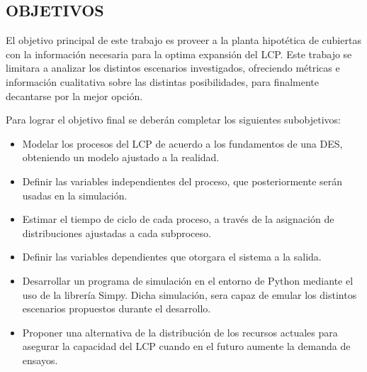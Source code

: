 \subsection{OBJETIVOS}\label{sec_obj}
El objetivo principal de este trabajo
es proveer a la planta hipotética de cubiertas
con la información necesaria para la optima expansión del LCP.
Este trabajo se limitara a analizar los distintos escenarios investigados,
ofreciendo métricas e información cualitativa
sobre las distintas posibilidades,
para finalmente decantarse por la mejor opción.

Para lograr el objetivo final se deberán completar los siguientes subobjetivos:

\begin{itemize}
	\item Modelar los procesos del LCP
		de acuerdo a los fundamentos de una DES,
		obteniendo un modelo ajustado a la realidad.
	\item Definir las variables independientes del proceso,
		que posteriormente serán usadas en la simulación.
	\item Estimar el tiempo de ciclo de cada proceso,
		a través de la asignación de
		distribuciones ajustadas a cada subproceso.
	\item Definir las variables dependientes
		que otorgara el sistema a la salida.
	\item Desarrollar un programa de simulación en el entorno de Python
		mediante el uso de la librería Simpy.
		Dicha simulación, sera capaz de emular
		los distintos escenarios propuestos durante el desarrollo.
	\item Proponer una alternativa de la distribución de los recursos actuales
		para asegurar la capacidad del LCP cuando en el futuro aumente la
		demanda de ensayos.
\end{itemize}
